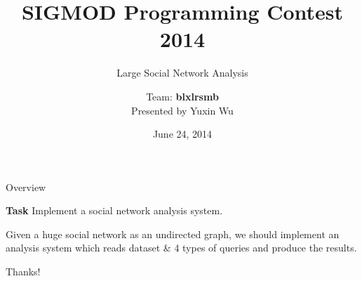 \documentclass {beamer}
\title{SIGMOD Programming Contest 2014}
\subtitle{Large Social Network Analysis}
\author {Team: \textbf{blxlrsmb}\\ Presented by Yuxin Wu}
\institute{
  Department of Computer Science and Technology\\
  Tsinghua University\\
}
\date{June 24, 2014}
\theoremstyle{plain}
\begin{document}
\frame[plain]{\titlepage}

\begin{frame}{Overview}
\begin{exampleblock}{\textbf{Task}}
Implement a social network analysis system.
\end{exampleblock}
Given a huge social network as an undirected graph,
we should implement an
analysis system which reads dataset \& 4 types of queries and
produce the results.
\end{frame}










\begin{frame}{}
  \begin{center}
  \Huge Thanks!
\end{center}
\end{frame}
\end{document}
